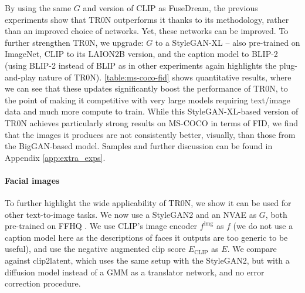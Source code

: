 \documentclass[nohyperref]{article}
\theoremstyle{plain}
\theoremstyle{definition}
\theoremstyle{remark}
\begin{document}
By using the same $G$ and version of CLIP as FuseDream, the previous experiments show that TR0N outperforms it thanks to its methodology, rather than an improved choice of networks.
Yet, these networks can be improved. To further strengthen TR0N,  we upgrade: $G$ to a StyleGAN-XL \citep{sauer2022stylegan} -- also pre-trained on ImageNet, CLIP to its LAION2B \citep{schuhmann2022laionb} version, and the caption model to BLIP-2 \citep{li2023blip} (using BLIP-2 instead of BLIP as in other experiments again highlights the plug-and-play nature of TR0N). \autoref{table:ms-coco-fid} shows quantitative results, where we can see that these updates significantly boost the performance of TR0N, to the point of making it competitive with very large models requiring text/image data and much more compute to train. While this StyleGAN-XL-based version of TR0N achieves particularly strong results on MS-COCO in terms of FID, we find that the images it produces are not consistently better, visually, than those from the BigGAN-based model. Samples and further discussion can be found in Appendix \ref{app:extra_exps}.


\paragraph{Facial images} To further highlight the wide applicability of TR0N, we show it can be used for other text-to-image tasks. We now use a StyleGAN2 \citep{Karras2019stylegan2} and an NVAE as $G$, both pre-trained on FFHQ \citep{karras2019style}. We use CLIP's image encoder $f^{\text{img}}$ as $f$ (we do not use a caption model here as the descriptions of faces it outputs are too generic to be useful), and use the negative augmented clip score $E_{\text{CLIP}}$ as $E$. We compare against clip2latent, which uses the same setup with the StyleGAN2, but with a diffusion model instead of a GMM as a translator network, and no error correction procedure.
\end{document}
